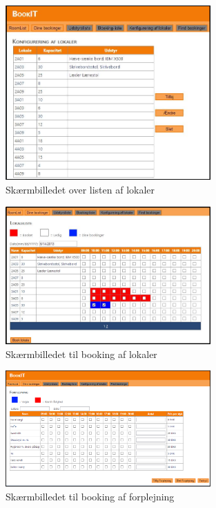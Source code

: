 \begin{figure}[h!]
  \centering
    \includegraphics[width=0.7\textwidth]{Appendix/GUI-Prototype/DigitalMockup/LokaleListe}
  \caption{Skærmbilledet over listen af lokaler}
\label{App_GUI_final_LokaleListe}
\end{figure}

\begin{figure}[h!]
  \centering
    \includegraphics[width=0.7\textwidth]{Appendix/GUI-Prototype/DigitalMockup/GridEksempel}
  \caption{Skærmbilledet til booking af lokaler}
\label{App_GUI_final_GridEksempel}
\end{figure}

\begin{figure}[h!]
  \centering
    \includegraphics[width=0.7\textwidth]{Appendix/GUI-Prototype/DigitalMockup/Forplejning}
  \caption{Skærmbilledet til booking af forplejning}
\label{App_GUI_final_Forplejning}
\end{figure}

